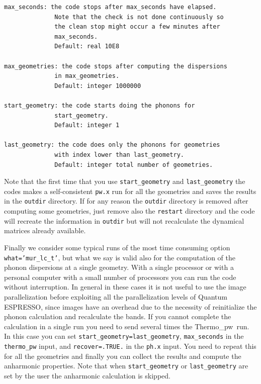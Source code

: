 \documentclass[12pt,a4paper,twoside]{report}
\def\qe{{\sc Quantum ESPRESSO}}
\def\thermo{{\sc Thermo}\_{\sc pw}}
\begin{document}
\begin{verbatim}
max_seconds: the code stops after max_seconds have elapsed. 
              Note that the check is not done continuously so 
              the clean stop might occur a few minutes after 
              max_seconds.
              Default: real 10E8

max_geometries: the code stops after computing the dispersions 
              in max_geometries.
              Default: integer 1000000

start_geometry: the code starts doing the phonons for 
              start_geometry.
              Default: integer 1

last_geometry: the code does only the phonons for geometries 
              with index lower than last_geometry.
              Default: integer total number of geometries.
\end{verbatim}

Note that the first time that you use \texttt{start\_geometry} and 
\texttt{last\_geometry} the codes makes a self-consistent \texttt{pw.x} 
run for all the geometries and saves the results in the \texttt{outdir}
directory. If for any reason the \texttt{outdir} directory is removed 
after computing some geometries, just remove also the
\texttt{restart} directory and the code will recreate the information
in \texttt{outdir} but will not recalculate the dynamical matrices 
already available. 

Finally we consider some typical runs of the most time consuming option
\texttt{what='mur\_lc\_t'}, but what we say is valid also for the computation
of the phonon dispersions at a single geometry.
With a single processor or with a personal computer with a small number of 
processors you can run the code without interruption.
In general in these cases it is not useful to use the image parallelization
before exploiting all the parallelization levels of \qe, since 
images have an overhead due to the necessity of reinitialize the phonon
calculation and recalculate the bands.
If you cannot complete the calculation in a single run 
you need to send several times the \thermo\ run. 
In this case you can set \texttt{start\_geometry=last\_geometry},
\texttt{max\_seconds} in the \texttt{thermo\_pw} input,
and \texttt{recover=.TRUE.} in the \texttt{ph.x} input. You need to
repeat this for all the geometries and finally you can collect the results
and compute the anharmonic properties. Note that when
\texttt{start\_geometry} or \texttt{last\_geometry} are set by the
user the anharmonic calculation is skipped.
\end{document}
